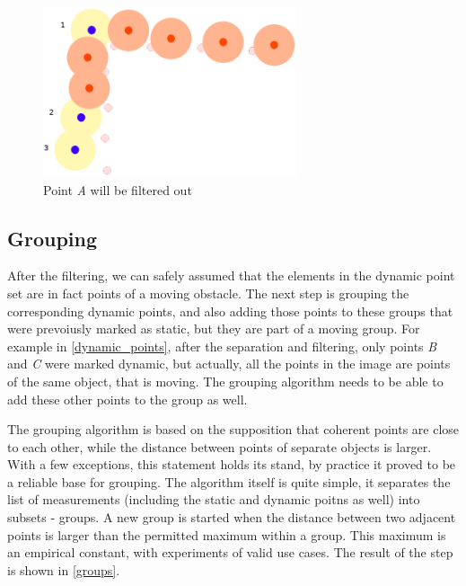 \begin{figure}[!ht]
    \centering
    \includegraphics[height=50mm]{figures/raw/dynamic_points.png}
    \caption{Point \textit{A} will be filtered out}
    \label{dynamic_points}
\end{figure}

\subsection{Grouping}
After the filtering, we can safely assumed that the elements in the dynamic point set are in fact points of a moving obstacle. The next step is grouping the corresponding dynamic points, and also adding those points to these groups that were prevoiusly marked as static, but they are part of a moving group. For example in \autoref{dynamic_points}, after the separation and filtering, only points \textit{B} and \textit{C} were marked dynamic, but actually, all the points in the image are points of the same object, that is moving. The grouping algorithm needs to be able to add these other points to the group as well.

The grouping algorithm is based on the supposition that coherent points are close to each other, while the distance between points of separate objects is larger. With a few exceptions, this statement holds its stand, by practice it proved to be a reliable base for grouping. The algorithm itself is quite simple, it separates the list of measurements (including the static and dynamic poitns as well) into subsets - groups. A new group is started when the distance between two adjacent points is larger than the permitted maximum within a group. This maximum is an empirical constant, with experiments of valid use cases. The result of the step is shown in \autoref{groups}.


